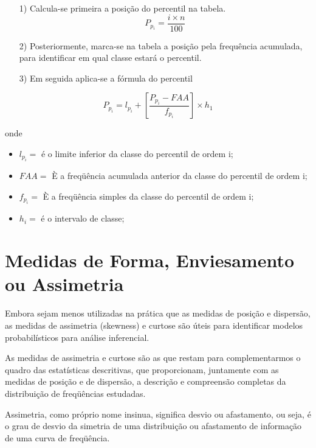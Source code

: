 \begin{enumerate}
\item [{1)}]Calcula-se primeira a posição do percentil na tabela.
$$ P_{p_{i}}=\frac{i \times n}{100}$$
\item [{2)}] Posteriormente, marca-se na tabela a posição pela frequência acumulada, para identificar em qual classe estará o percentil.
\item [{3)}] Em seguida aplica-se a fórmula do percentil
\end{enumerate}

\begin{equation}\label{}
    P_{p_{i}}= l_{p_{i}}+\left[\frac{P_{p_{i}}-FAA}{f_{p_{i}}}\right]\times h_{1}
\end{equation}

 onde

 \begin{itemize}
   \item $l_{p_{i}}=$ é o limite inferior da classe do percentil de ordem i;
   \item $FAA=$ È a freqüência acumulada anterior da classe do percentil de ordem i;
   \item $f_{p_{i}}=$ È a freqüência simples da classe do percentil de ordem i;
   \item $h_{i}=$ é o intervalo de classe;
 \end{itemize}



\section{Medidas de Forma, Enviesamento ou Assimetria }

\inic Embora sejam menos utilizadas na prática que as medidas de posição e
dispersão, as medidas de assimetria (skewness) e curtose são úteis para
identificar modelos probabilísticos para análise inferencial.

\inic As medidas de assimetria e curtose são as que restam para complementarmos o quadro das estatísticas descritivas, que proporcionam, juntamente com as medidas de posição e de dispersão, a descrição e compreensão completas da distribuição de freqüências estudadas.\vskip0.3cm

Assimetria, como próprio nome insinua, significa desvio ou afastamento, ou seja, é o grau de desvio da simetria de uma distribuição ou afastamento de informação de uma curva de freqüência.\vskip0.3cm





